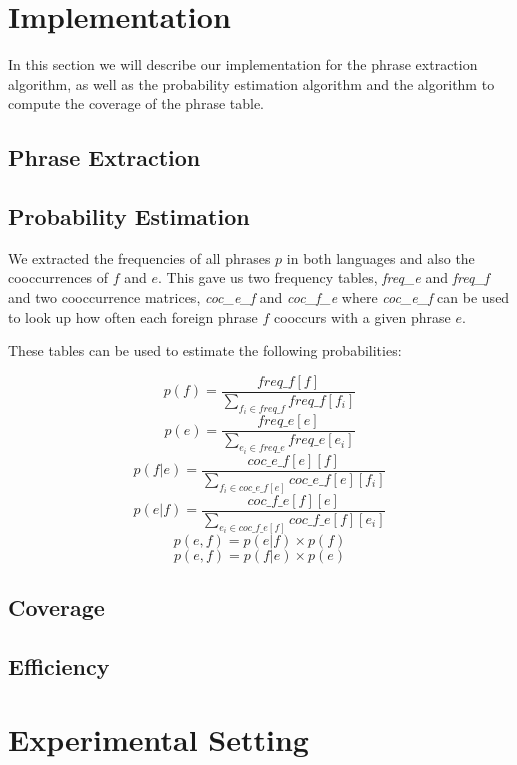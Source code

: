 \documentclass[11pt]{article}
\begin{document}
\section{Implementation}
\label{implem}
In this section we will describe our implementation for the phrase extraction algorithm, as well as the probability estimation algorithm and the algorithm to compute the coverage of the phrase table. 
\subsection{Phrase Extraction}
\label{implem1}

\subsection{Probability Estimation}
\label{implem2}
We extracted the frequencies of all phrases $p$ in both languages and also the cooccurrences of $f$ and $e$.
This gave us two frequency tables, \textit{freq\_e} and \textit{freq\_f} and two cooccurrence matrices, \textit{coc\_e\_f} and \textit{coc\_f\_e} where \textit{coc\_e\_f} can be used to look up how often each foreign phrase $f$ cooccurs with a given phrase $e$. 

These tables can be used to estimate the following probabilities:

$$ p(f) = \frac{freq\_f[f] }{  \sum_{f_i \in freq\_f} freq\_f[f_i]  } $$
$$ p(e) = \frac{freq\_e[e] }{  \sum_{e_i \in freq\_e} freq\_e[e_i]  } $$
$$ p(f|e) = \frac{coc\_e\_f[e][f]}{ \sum_{f_i \in coc\_e\_f[e]}  coc\_e\_f[e][f_i]} $$
$$ p(e|f) = \frac{coc\_f\_e[f][e]}{ \sum_{e_i \in coc\_f\_e[f]}  coc\_f\_e[f][e_i]} $$
$$ p(e, f) = p(e|f) \times p(f) $$
$$ p(e, f) = p(f|e) \times p(e) $$

\subsection{Coverage}
\label{implem2}


\subsection{Efficiency}

\section{Experimental Setting}
\end{document}
